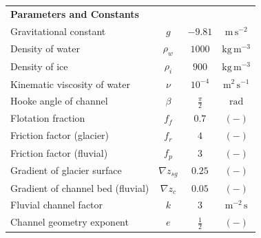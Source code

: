 \documentclass[11pt]{article}
\newcommand{\unit}[1]{$\mathrm{#1}$}
\begin{document}
\begin{spacing}{1}
\begin{table}[H]
\begin{tabular}{ l  c  c c }
              \textbf{Parameters and Constants}  & & &\\
              Gravitational constant&$g$& $-9.81$&$\mathrm{m\,s^{-2}}$\\
              Density of water & $\rho_w$& $1000$ & $\mathrm{kg\,m^{-3}}$ \\
              Density of ice & $\rho_i$& $900$ & $\mathrm{kg\,m^{-3}}$ \\
              Kinematic viscosity of water &$\nu$& $10^{-4}$& $\mathrm{m^2\,s^{-1}}$\\
              Hooke angle of channel & $\beta$ & $\frac{\pi}{2}$ & \unit{rad}\\
              Flotation fraction & $f_f$&$0.7$& $\mathrm{(-)}$\\
              Friction factor (glacier) & $f_r$ & $4$ & $\mathrm{(-)}$ \\
              Friction factor (fluvial) & $f_p$ & $3$ & $\mathrm{(-)}$\\
              Gradient of glacier surface & $\nabla z_{sg}$ &$0.25$& $\mathrm{(-)}$\\
              Gradient of channel bed (fluvial) &$\nabla z_{c}$ &$0.05$& $\mathrm{(-)}$\\
              Fluvial channel factor & $k$ &$3$ & $\mathrm{m^{-2}\, s}$\\
              Channel geometry exponent &$e$& $\frac{1}{2}$&$\mathrm{(-)}$ \\
              \hline
            \end{tabular}
            \label{table:vpm}
          \end{table}
        
          

\end{spacing}
\end{document}
